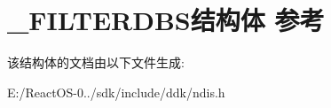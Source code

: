 \hypertarget{struct___f_i_l_t_e_r_d_b_s}{}\section{\+\_\+\+F\+I\+L\+T\+E\+R\+D\+B\+S结构体 参考}
\label{struct___f_i_l_t_e_r_d_b_s}


该结构体的文档由以下文件生成\+:\begin{DoxyCompactItemize}
\item 
E\+:/\+React\+O\+S-\/0../sdk/include/ddk/ndis.\+h\end{DoxyCompactItemize}
